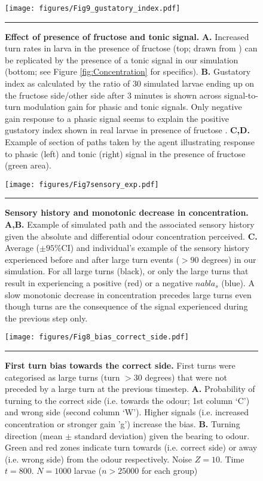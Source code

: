 \documentclass[11pt,a4paper]{article}
\newcommand{\todoBW}[1]{\todo[author=BW,color=orange, size=\tiny,inline]{1}}
\begin{document}
\begin{figure}
\begin{center}
\texttt{[image: figures/Fig9\_gustatory\_index.pdf]}
\caption{{\bf Effect of presence of fructose and tonic signal.}
{\bf A.} Increased turn rates in larva in the presence of fructose (top; drawn from \citep{schleyer2015learning}) can be replicated by the presence of a tonic signal in our simulation (bottom; see Figure \ref{fig:Concentration} for specifics). 
{\bf B.} Gustatory index as calculated by the ratio of 30 simulated larvae ending up on the fructose side/other side after 3 minutes is shown across signal-to-turn modulation gain for phasic and tonic signals. Only negative gain response to a phasic signal seems to explain the positive gustatory index shown in real larvae in presence of fructose \citep{schleyer2011behavior}.
{\bf C,D.} Example of section of paths taken by the agent illustrating response to phasic (left) and tonic (right) signal in the presence of fructose (green area).
\todoBW{I'm not sure what is explained in Figure \ref{fig:Concentration} that is usefully specific here?}
\label{fig:Tonic}}
\hrule
\end{center}
\end{figure}


\begin{figure}
\begin{center}
\texttt{[image: figures/Fig7sensory\_exp.pdf]}
\caption{{\bf Sensory history and monotonic decrease in concentration.} {\bf A,B.} Example of simulated path and the associated sensory history given the absolute and differential odour concentration perceived.
{\bf  C.} Average ($\pm 95\%$CI) and individual’s example of the sensory history experienced before and after large turn events ($>90$ degrees) in our simulation. For all large turns (black), or only the large turns that result in experiencing a positive (red) or a negative $nabla_s$ (blue). A slow monotonic decrease in concentration precedes large turns even though turns are the consequence of the signal experienced during the previous step only.
\label{fig:SensoryHistory}}
\hrule
\end{center}
\end{figure}

\begin{figure}
\begin{center}
\texttt{[image: figures/Fig8\_bias\_correct\_side.pdf]}
\caption{{\bf First turn bias towards the correct side.} First turns were categorised as large turns (turn $>30$ degrees) that were not preceded by a large turn at the previous timestep.
{\bf A.} Probability of turning to the correct side (i.e. towards the odour; 1st column ‘C’) and wrong side (second column ‘W’). Higher signals (i.e. increased concentration or stronger gain 'g') increase the bias.
{\bf B.} Turning direction (mean $\pm$ standard deviation) given the bearing to odour. Green and red zones indicate turn towards (i.e. correct side) or away (i.e. wrong side) from the odour respectively. Noise $Z = 10$. Time $t=800$. $N=1000$ larvae ($n > 25000$ for each group)
\label{fig:FirstTurn}}
\hrule
\end{center}
\end{figure}
\end{document}
